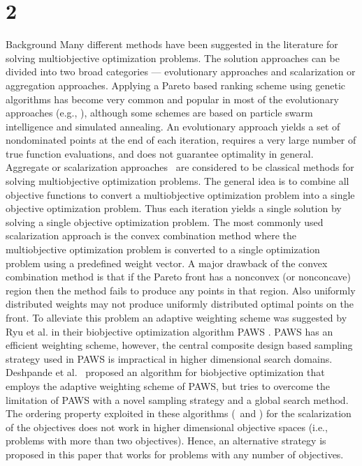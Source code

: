 \section{2}{Background} 
Many different methods have been suggested in the literature for solving
multiobjective optimization problems. The solution approaches can be divided
into two broad categories --- evolutionary approaches and scalarization or
aggregation approaches. Applying a Pareto based ranking scheme using genetic
algorithms has become very common and popular in most of the evolutionary
approaches (e.g., \DPAM), although some schemes are based on particle swarm
intelligence and simulated annealing.  An evolutionary approach yields a set of
nondominated points at the end of each iteration, requires a very large number
of true function evaluations,  and does not guarantee optimality in general.
Aggregate or scalarization approaches \E\ are considered to be classical
methods for solving multiobjective optimization problems. The general idea is
to combine all objective functions to convert a multiobjective optimization
problem into a single objective optimization problem. Thus each iteration
yields a single solution by solving a single objective optimization problem.
The most commonly used scalarization approach is the convex combination method
where the multiobjective optimization problem is converted to a single
optimization problem using a predefined weight vector. A major drawback of the
convex combination method is that if the Pareto front has a nonconvex (or
nonconcave) region then the method fails to produce any points in that region.
Also uniformly distributed weights may not produce uniformly distributed
optimal points on the front. To alleviate this problem an adaptive weighting
scheme was suggested by Ryu et al. in their biobjective optimization algorithm
PAWS \RKW. PAWS has an efficient weighting scheme, however, the central
composite design based sampling strategy used in PAWS is impractical in higher
dimensional search domains. Deshpande et al. \DWC\ proposed an algorithm for
biobjective optimization that employs the adaptive weighting scheme of PAWS,
but tries to overcome the limitation of PAWS with a novel sampling strategy and
a global search method. The ordering property exploited in these algorithms
(\RKW\ and \DWC) for the scalarization of the objectives does not work in
higher dimensional objective spaces (i.e., problems with more than two
objectives). Hence, an alternative strategy is proposed in this paper that
works for problems with any number of objectives. 

